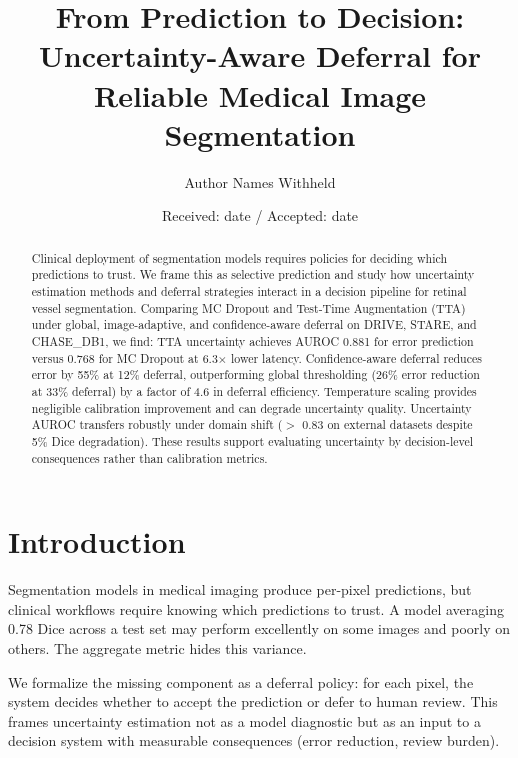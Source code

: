 \documentclass[smallextended]{svjour3}
\begin{document}
\title{From Prediction to Decision: Uncertainty-Aware Deferral for Reliable Medical Image Segmentation}

\author{Author Names Withheld}

\date{Received: date / Accepted: date}

\maketitle

\begin{abstract}
Clinical deployment of segmentation models requires policies for deciding which
predictions to trust. We frame this as selective prediction and study how
uncertainty estimation methods and deferral strategies interact in a decision
pipeline for retinal vessel segmentation. Comparing MC Dropout and Test-Time
Augmentation (TTA) under global, image-adaptive, and confidence-aware deferral
on DRIVE, STARE, and CHASE\_DB1, we find: TTA uncertainty achieves AUROC 0.881
for error prediction versus 0.768 for MC Dropout at 6.3$\times$ lower latency.
Confidence-aware deferral reduces error by 55\% at 12\% deferral, outperforming
global thresholding (26\% error reduction at 33\% deferral) by a factor of
4.6 in deferral efficiency. Temperature scaling provides negligible calibration
improvement and can degrade uncertainty quality. Uncertainty AUROC transfers
robustly under domain shift ($>$ 0.83 on external datasets despite 5\% Dice
degradation). These results support evaluating uncertainty by decision-level
consequences rather than calibration metrics.

\end{abstract}

\section{Introduction}

Segmentation models in medical imaging produce per-pixel predictions, but
clinical workflows require knowing which predictions to trust. A model
averaging 0.78 Dice across a test set may perform excellently on some images
and poorly on others. The aggregate metric hides this variance.

We formalize the missing component as a deferral policy: for each pixel, the
system decides whether to accept the prediction or defer to human review. This
frames uncertainty estimation not as a model diagnostic but as an input to a
decision system with measurable consequences (error reduction, review burden).
\end{document}
